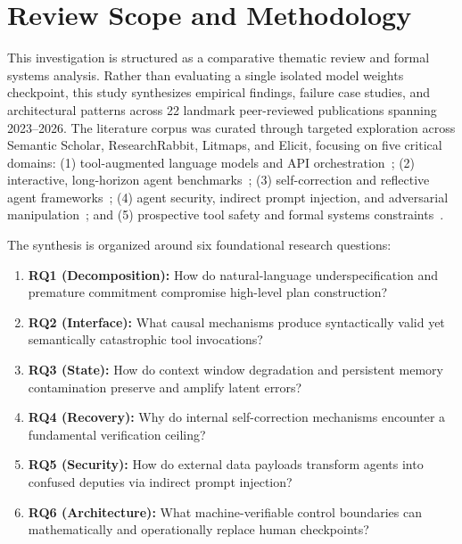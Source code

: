 \documentclass[conference]{IEEEtran}
\begin{document}
\section{Review Scope and Methodology}
This investigation is structured as a comparative thematic review and formal systems analysis. Rather than evaluating a single isolated model weights checkpoint, this study synthesizes empirical findings, failure case studies, and architectural patterns across 22 landmark peer-reviewed publications spanning 2023--2026. The literature corpus was curated through targeted exploration across Semantic Scholar, ResearchRabbit, Litmaps, and Elicit, focusing on five critical domains: (1) tool-augmented language models and API orchestration~\cite{schick2023toolformer, qin2024toolllm, chen2025acebench}; (2) interactive, long-horizon agent benchmarks~\cite{zhou2024webarena, liu2024agentbench, deng2023mind2web, yao2025taubench}; (3) self-correction and reflective agent frameworks~\cite{madaan2023selfrefine, shinn2023reflexion, wang2023voyager}; (4) agent security, indirect prompt injection, and adversarial manipulation~\cite{debenedetti2024agentdojo, zhang2025asb, andriushchenko2025agentharm, zhang2025agentsafetybench}; and (5) prospective tool safety and formal systems constraints~\cite{xia2025safetoolbench, doshi2026towards}.

The synthesis is organized around six foundational research questions:
\begin{enumerate}
    \item \textbf{RQ1 (Decomposition):} How do natural-language underspecification and premature commitment compromise high-level plan construction?
    \item \textbf{RQ2 (Interface):} What causal mechanisms produce syntactically valid yet semantically catastrophic tool invocations?
    \item \textbf{RQ3 (State):} How do context window degradation and persistent memory contamination preserve and amplify latent errors?
    \item \textbf{RQ4 (Recovery):} Why do internal self-correction mechanisms encounter a fundamental verification ceiling?
    \item \textbf{RQ5 (Security):} How do external data payloads transform agents into confused deputies via indirect prompt injection?
    \item \textbf{RQ6 (Architecture):} What machine-verifiable control boundaries can mathematically and operationally replace human checkpoints?
\end{enumerate}
\end{document}
